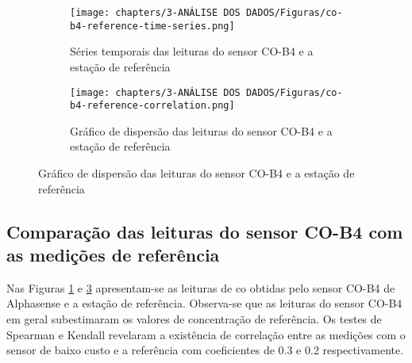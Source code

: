\begin{figure}[h]
    \centering
    \caption{Séries temporais e gráficos de dispersão das medições de \acrshort{co}}
    \begin{subfigure}{0.44\textwidth}
        \texttt{[image: chapters/3-ANÁLISE DOS DADOS/Figuras/co-b4-reference-time-series.png]}
        \caption{Séries temporais das leituras do sensor CO-B4 e a estação de referência}
        \label{fig:data-co-reference-time-series}
    \end{subfigure}
    \hfill
    \begin{subfigure}{0.54\textwidth}
        \texttt{[image: chapters/3-ANÁLISE DOS DADOS/Figuras/co-b4-reference-correlation.png]}
        \caption{Gráfico de dispersão das leituras do sensor CO-B4 e a estação de referência}
        \label{fig:data-co-reference-corr}
    \end{subfigure}
\end{figure}

\subsection{Comparação das leituras do sensor CO-B4 com as medições de referência}

Nas Figuras \ref{fig:data-co-reference-time-series} e \ref{fig:data-co-reference-corr} apresentam-se as leituras de \acrshort{co} obtidas pelo sensor CO-B4 de Alphasense e a estação de referência. Observa-se que as leituras do sensor CO-B4 em geral subestimaram os valores de concentração de referência. Os testes de Spearman e Kendall revelaram a existência de correlação entre as medições com o sensor de baixo custo e a referência com coeficientes de 0.3 e 0.2 respectivamente.

